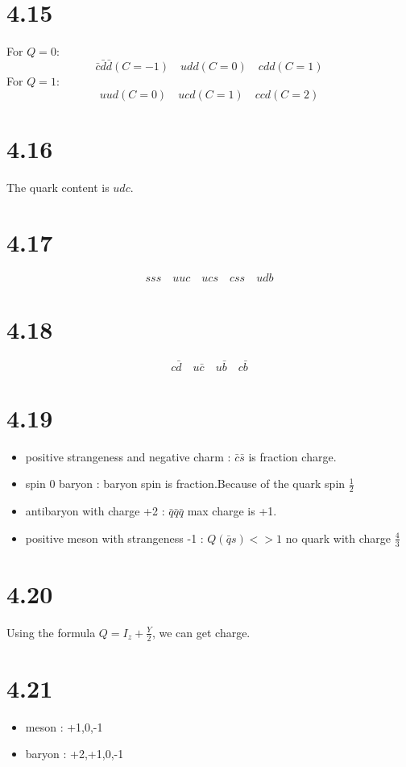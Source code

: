 \documentclass{article}
\begin{document}
\begin{CJK*}{GBK}{song}
\section{4.15}
For $Q=0$:
\begin{equation}
\bar{c}\bar{d}\bar{d}(C=-1)\quad udd(C=0)\quad cdd(C=1) 
\end{equation}
For $Q=1$:
\begin{equation}
uud(C=0)\quad ucd(C=1)\quad ccd(C=2) 
\end{equation}

\section{4.16}
The quark content is $udc$.
\section{4.17}
\begin{equation}
sss\quad uuc\quad ucs\quad css\quad udb
\end{equation}

\section{4.18}
\begin{equation}
c\bar{d}\quad u\bar{c}\quad u\bar{b}\quad c\bar{b}
\end{equation}

\section{4.19}
\begin{itemize}
\item positive strangeness and negative charm : $\bar{c}\bar{s}$ is fraction charge.
\item spin 0 baryon : baryon spin is fraction.Because of the quark spin $\frac{1}{2}$
\item antibaryon with charge +2 : $\bar{q}\bar{q}\bar{q}$ max charge is +1.
\item positive meson with strangeness -1 : $Q(\bar{q}s)<>1$ no quark with charge $\frac{4}{3}$ 
\end{itemize}

\section{4.20}
Using the formula $Q=I_z+\frac{Y}{2}$, we can get charge.
\section{4.21}
\begin{itemize}
\item meson : +1,0,-1
\item baryon : +2,+1,0,-1
\end{itemize}

\end{CJK*}
\end{document}
